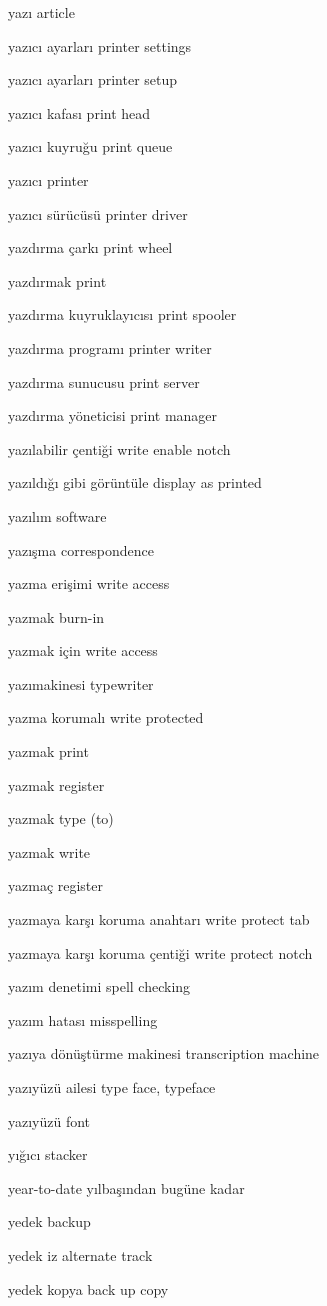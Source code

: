 \documentclass[12pt,fleqn]{article}\usepackage{../../common}
\begin{document}
yazı article

yazıcı ayarları printer settings

yazıcı ayarları printer setup

yazıcı kafası print head

yazıcı kuyruğu print queue

yazıcı printer

yazıcı sürücüsü printer driver

yazdırma çarkı print wheel

yazdırmak print

yazdırma kuyruklayıcısı print spooler

yazdırma programı printer writer

yazdırma sunucusu print server

yazdırma yöneticisi print manager

yazılabilir çentiği write enable notch

yazıldığı gibi görüntüle display as printed

yazılım software

yazışma correspondence

yazma erişimi write access

yazmak burn-in

yazmak için write access

yazımakinesi typewriter

yazma korumalı write protected

yazmak print

yazmak register

yazmak type (to)

yazmak write

yazmaç register

yazmaya karşı koruma anahtarı write protect tab

yazmaya karşı koruma çentiği write protect notch

yazım denetimi spell checking

yazım hatası misspelling

yazıya dönüştürme makinesi transcription machine

yazıyüzü ailesi type face, typeface

yazıyüzü font

yığıcı stacker

year-to-date yılbaşından bugüne kadar

yedek backup

yedek iz alternate track

yedek kopya back up copy
\end{document}
